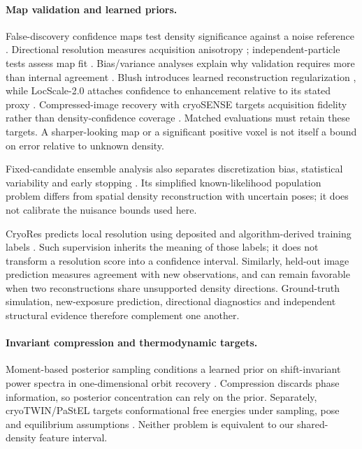 \paragraph{Map validation and learned priors.} False-discovery confidence maps test density significance against a noise reference \citep{beckers2019}. Directional resolution measures acquisition anisotropy \citep{monodir2020}; independent-particle tests assess map fit \citep{independent2020}. Bias/variance analyses explain why validation requires more than internal agreement \citep{sorzano2022}. Blush introduces learned reconstruction regularization \citep{blush2024}, while LocScale-2.0 attaches confidence to enhancement relative to its stated proxy \citep{locscale2026}. Compressed-image recovery with cryoSENSE targets acquisition fidelity rather than density-confidence coverage \citep{cryosense2026}. Matched evaluations must retain these targets. A sharper-looking map or a significant positive voxel is not itself a bound on error relative to unknown density.

Fixed-candidate ensemble analysis also separates discretization bias, statistical variability and early stopping \citep{mordant2026}. Its simplified known-likelihood population problem differs from spatial density reconstruction with uncertain poses; it does not calibrate the nuisance bounds used here.

CryoRes predicts local resolution using deposited and algorithm-derived training labels \citep{cryores2023}. Such supervision inherits the meaning of those labels; it does not transform a resolution score into a confidence interval. Similarly, held-out image prediction measures agreement with new observations, and can remain favorable when two reconstructions share unsupported density directions. Ground-truth simulation, new-exposure prediction, directional diagnostics and independent structural evidence therefore complement one another.

\paragraph{Invariant compression and thermodynamic targets.} Moment-based posterior sampling conditions a learned prior on shift-invariant power spectra in one-dimensional orbit recovery \citep{janson2025}. Compression discards phase information, so posterior concentration can rely on the prior. Separately, cryoTWIN/PaStEL targets conformational free energies under sampling, pose and equilibrium assumptions \citep{cryotwin2026}. Neither problem is equivalent to our shared-density feature interval.

